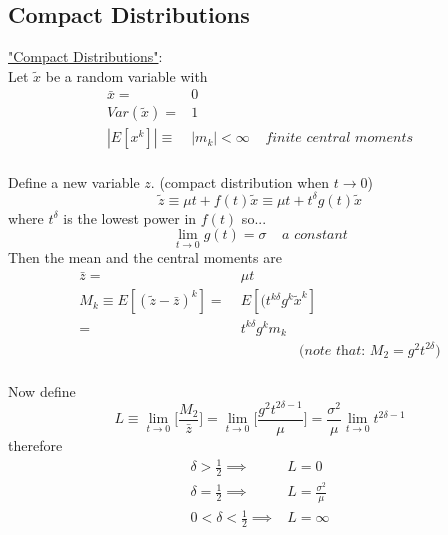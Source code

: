 \documentclass[
14pt,notheorems,hyperref={pdfauthor=whatever}
]{beamer}
\begin{document}
\subsection{Compact Distributions}

\begin{frame}
\underline{"Compact Distributions"}:\\
\hfill\break
Let $\tilde x$ be a random variable with\\
\begin{align*}
    \bar x =& 0\\
    Var(\tilde x) =& 1\\
    |E[x^k]| \equiv& |m_k| < \infty \;\;\;\; \textit{finite central moments}\\
\end{align*}
\end{frame}

\begin{frame}
Define a new variable $z$. (compact distribution when $t \to 0$)\\
\[\tilde z \equiv \mu t + f(t)\tilde x \equiv \mu t + t^\delta g(t) \tilde x\]
where $t^\delta$ is the lowest power in $f(t)$ so...\\
\[\lim_{t \to 0} g(t) = \sigma \;\;\;\; \textit{a constant}\]
Then the mean and the central moments are\\
\begin{align*}
    \bar z =&\; \mu t\\
    M_k \equiv E[(\tilde z - \bar z)^k] =&\; E[(t^{k\delta}g^k \tilde x^k]\\
    =&\; t^{k\delta}g^k m_k\\
    &\;\;\;\;\;\;\;\;\;\;\;\;\;\;\;\;\textit{(note that: $M_2 = g^2 t^{2\delta}$)}\\
\end{align*}
\end{frame}

\begin{frame}
Now define\\
\[L \equiv \lim_{t \to 0}\Bigg[\frac{M_2}{\bar z}\Bigg] = \lim_{t \to 0}\Bigg[\frac{g^2 t^{2\delta-1}}{\mu}\Bigg] = \frac{\sigma^2}{\mu}\lim_{t\to0}t^{2\delta-1}\]
therefore\\
\begin{align*}
    \delta>\frac{1}{2} \implies& L=0\\
    \delta=\frac{1}{2} \implies& L=\frac{\sigma^2}{\mu}\\
    0<\delta<\frac{1}{2} \implies& L=\infty\\
\end{align*}
\end{frame}
\end{document}
